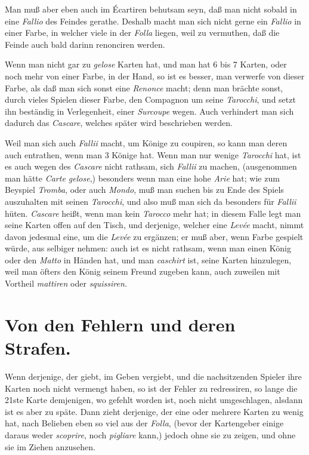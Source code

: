 \documentclass[11pt,a6paper,twoside]{article}
\begin{document}
Man muß aber eben auch im Écartiren behutsam seyn, daß man nicht sobald in eine \textit{Fallio} des Feindes gerathe. Deshalb macht man sich nicht gerne ein \textit{Fallio} in einer Farbe, in welcher viele in der \textit{Folla} liegen, weil zu vermuthen, daß die Feinde auch bald darinn renonciren werden.

Wenn man nicht gar zu \textit{gelose} Karten hat, und man hat 6 bis 7 Karten, oder noch mehr von einer Farbe, in der Hand, so ist es besser, man verwerfe von dieser Farbe, als daß man sich sonst eine \textit{Renonce} macht; denn man brächte sonst, durch vieles Spielen dieser Farbe, den Compagnon um seine \textit{Tarocchi}, und setzt ihn beständig in Verlegenheit, einer \textit{Surcoupe} wegen. Auch verhindert man sich dadurch das \textit{Cascare}, welches später wird beschrieben werden.

Weil man sich auch \textit{Fallii} macht, um Könige zu coupiren, so kann man deren auch entrathen, wenn man 3 Könige hat. Wenn man nur wenige \textit{Tarocchi} hat, ist es auch wegen des \textit{Cascare} nicht rathsam, sich \textit{Fallii} zu machen, (ausgenommen man hätte \textit{Carte gelose},) besonders wenn man eine hohe \textit{Arie} hat; wie zum Beyspiel \textit{Tromba}, oder auch \textit{Mondo}, muß man suchen bis zu Ende des Spiels auszuhalten mit seinen \textit{Tarocchi}, und also muß man sich da besonders für \textit{Fallii} hüten. \textit{Cascare} heißt, wenn man kein \textit{Tarocco} mehr hat; in diesem Falle legt man seine Karten offen auf den Tisch, und derjenige, welcher eine \textit{Levée} macht, nimmt davon jedesmal eine, um die \textit{Levée} zu ergänzen; er muß aber, wenn Farbe gespielt würde, aus selbiger nehmen: auch ist es nicht rathsam, wenn man einen König oder den \textit{Matto} in Händen hat, und man \textit{caschirt} ist, seine Karten hinzulegen, weil man öfters den König seinem Freund zugeben kann, auch zuweilen mit Vortheil \textit{mattiren} oder \textit{squissiren}.


\section{Von den Fehlern und deren Strafen.}

Wenn derjenige, der giebt, im Geben vergiebt, und die nachsitzenden Spieler ihre Karten noch nicht vermengt haben, so ist der Fehler zu redressiren, so lange die 21ste Karte demjenigen, wo gefehlt worden ist, noch nicht umgeschlagen, alsdann ist es aber zu späte. Dann zieht derjenige, der eine oder mehrere Karten zu wenig hat, nach Belieben eben so viel aus der \textit{Folla}, (bevor der Kartengeber einige daraus weder \textit{scoprire}, noch \textit{pigliare} kann,) jedoch ohne sie zu zeigen, und ohne sie im Ziehen anzusehen.
\end{document}
